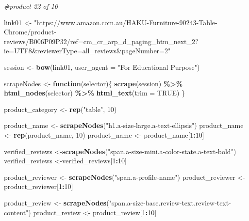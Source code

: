 \documentclass[
]{article}
\newenvironment{Shaded}{\begin{snugshade}}{\end{snugshade}}
\newcommand{\AttributeTok}[1]{\textcolor[rgb]{0.13,0.29,0.53}{#1}}
\newcommand{\CommentTok}[1]{\textcolor[rgb]{0.56,0.35,0.01}{\textit{#1}}}
\newcommand{\ConstantTok}[1]{\textcolor[rgb]{0.56,0.35,0.01}{#1}}
\newcommand{\ControlFlowTok}[1]{\textcolor[rgb]{0.13,0.29,0.53}{\textbf{#1}}}
\newcommand{\DecValTok}[1]{\textcolor[rgb]{0.00,0.00,0.81}{#1}}
\newcommand{\FunctionTok}[1]{\textcolor[rgb]{0.13,0.29,0.53}{\textbf{#1}}}
\newcommand{\NormalTok}[1]{#1}
\newcommand{\OtherTok}[1]{\textcolor[rgb]{0.56,0.35,0.01}{#1}}
\newcommand{\SpecialCharTok}[1]{\textcolor[rgb]{0.81,0.36,0.00}{\textbf{#1}}}
\newcommand{\StringTok}[1]{\textcolor[rgb]{0.31,0.60,0.02}{#1}}
\begin{document}
\begin{Shaded}
\begin{Highlighting}[]
\CommentTok{\#product 22 of 10}

\NormalTok{link01 }\OtherTok{\textless{}{-}} \StringTok{"https://www.amazon.com.au/HAKU{-}Furniture{-}90243{-}Table{-}Chrome/product{-}reviews/B006P09P32/ref=cm\_cr\_arp\_d\_paging\_btm\_next\_2?ie=UTF8\&reviewerType=all\_reviews\&pageNumber=2"}


\NormalTok{  session }\OtherTok{\textless{}{-}} \FunctionTok{bow}\NormalTok{(link01,}
               \AttributeTok{user\_agent =} \StringTok{"For Educational Purpose"}\NormalTok{)}

\NormalTok{  scrapeNodes }\OtherTok{\textless{}{-}} \ControlFlowTok{function}\NormalTok{(selector)\{}
    \FunctionTok{scrape}\NormalTok{(session) }\SpecialCharTok{\%\textgreater{}\%}
      \FunctionTok{html\_nodes}\NormalTok{(selector) }\SpecialCharTok{\%\textgreater{}\%}
      \FunctionTok{html\_text}\NormalTok{(}\AttributeTok{trim =} \ConstantTok{TRUE}\NormalTok{)}
\NormalTok{  \}}

\NormalTok{  product\_category }\OtherTok{\textless{}{-}} \FunctionTok{rep}\NormalTok{(}\StringTok{"table"}\NormalTok{, }\DecValTok{10}\NormalTok{)}

\NormalTok{  product\_name }\OtherTok{\textless{}{-}} \FunctionTok{scrapeNodes}\NormalTok{(}\StringTok{"h1.a{-}size{-}large.a{-}text{-}ellipsis"}\NormalTok{)}
\NormalTok{  product\_name }\OtherTok{\textless{}{-}} \FunctionTok{rep}\NormalTok{(product\_name, }\DecValTok{10}\NormalTok{)}
\NormalTok{  product\_name }\OtherTok{\textless{}{-}}\NormalTok{ product\_name[}\DecValTok{1}\SpecialCharTok{:}\DecValTok{10}\NormalTok{]}
  
\NormalTok{  verified\_reviews }\OtherTok{\textless{}{-}}\FunctionTok{scrapeNodes}\NormalTok{(}\StringTok{"span.a{-}size{-}mini.a{-}color{-}state.a{-}text{-}bold"}\NormalTok{)}
\NormalTok{  verified\_reviews }\OtherTok{\textless{}{-}}\NormalTok{verified\_reviews[}\DecValTok{1}\SpecialCharTok{:}\DecValTok{10}\NormalTok{]}
  
\NormalTok{  product\_reviewer }\OtherTok{\textless{}{-}} \FunctionTok{scrapeNodes}\NormalTok{(}\StringTok{"span.a{-}profile{-}name"}\NormalTok{)}
\NormalTok{  product\_reviewer }\OtherTok{\textless{}{-}}\NormalTok{ product\_reviewer[}\DecValTok{1}\SpecialCharTok{:}\DecValTok{10}\NormalTok{]}
  
\NormalTok{  product\_review }\OtherTok{\textless{}{-}} \FunctionTok{scrapeNodes}\NormalTok{(}\StringTok{"span.a{-}size{-}base.review{-}text.review{-}text{-}content"}\NormalTok{)}
\NormalTok{  product\_review }\OtherTok{\textless{}{-}}\NormalTok{ product\_review[}\DecValTok{1}\SpecialCharTok{:}\DecValTok{10}\NormalTok{]}
  

\end{Highlighting}
\end{Shaded}
\end{document}
